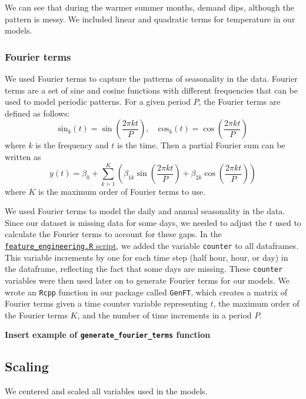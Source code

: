 \documentclass[
]{article}
\begin{document}
We can see that during the warmer summer months, demand dips, although
the pattern is messy. We included linear and quadratic terms for
temperature in our models.

\hypertarget{fourier-terms}{%
\subsubsection{Fourier terms}\label{fourier-terms}}

We used Fourier terms to capture the patterns of seasonality in the
data. Fourier terms are a set of sine and cosine functions with
different frequencies that can be used to model periodic patterns. For a
given period \(P\), the Fourier terms are defined as follows:
\[\text{sin}_k(t) = \sin\left(\frac{2\pi kt}{P}\right), \quad \text{cos}_k(t) = \cos\left(\frac{2\pi kt}{P}\right)\]
where \(k\) is the frequency and \(t\) is the time. Then a partial
Fourier sum can be written as
\[ y(t) = \beta_0 + \sum_{k=1}^{K} \left( \beta_{1k} \sin\left(\frac{2\pi kt}{P}\right) + \beta_{2k} \cos\left(\frac{2\pi kt}{P}\right) \right) \]
where \(K\) is the maximum order of Fourier terms to use.

We used Fourier terms to model the daily and annual seasonality in the
data. Since our dataset is missing data for some days, we needed to
adjust the \(t\) used to calculate the Fourier terms to account for
these gaps. In the
\href{https://github.com/Shermjj/SC-2-Electric-Boogalo/blob/main/feature_engineering.R}{\texttt{feature\_engineering.R}
script}, we added the variable \texttt{counter} to all dataframes. This
variable increments by one for each time step (half hour, hour, or day)
in the dataframe, reflecting the fact that some days are missing. These
\texttt{counter} variables were then used later on to generate Fourier
terms for our models. We wrote an \texttt{Rcpp} function in our package
called \texttt{GenFT}, which creates a matrix of Fourier terms given a
time counter variable representing \(t\), the maximum order of the
Fourier terms \(K\), and the number of time increments in a period
\(P\).

\textbf{Insert example of \texttt{generate\_fourier\_terms} function}

\hypertarget{scaling}{%
\subsection{Scaling}\label{scaling}}

We centered and scaled all variables used in the models.
\end{document}
